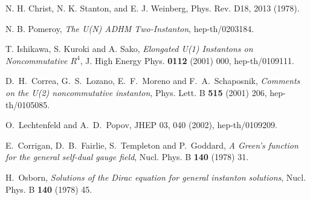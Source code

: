 \documentclass[a4paper,a4paper]{article}
\begin{document}
\begin{thebibliography}{99}
 N. H. Christ, N. K. Stanton, and E. J. Weinberg, Phys. Rev. D18,
2013 (1978).

 N. B. Pomeroy, {\it The U(N) ADHM
Two-Instanton}, hep-th/0203184.

 T. Ishikawa, S. Kuroki and A. Sako, {\it Elongated
U(1) Instantons on Noncommutative $R^4$}, J. High Energy Phys.
{\bf 0112} (2001) 000, hep-th/0109111.

 D.~H.~Correa, G.~S.~Lozano, E.~F.~Moreno and F.~A.~Schaposnik,
{\it Comments on the U(2) noncommutative instanton}, Phys. Lett. B
{\bf 515} (2001) 206, hep-th/0105085.

 O.~Lechtenfeld and A.~D.~Popov, JHEP 03, 040 (2002), hep-th/0109209.

 E.~Corrigan, D.~B.~Fairlie, S.~Templeton and
P.~Goddard, {\it A Green's function for the general self-dual
gauge field}, Nucl. Phys. B {\bf 140} (1978) 31.

 H.~Osborn, {\it Solutions of the Dirac equation for general instanton
solutions}, Nucl. Phys. B {\bf 140} (1978) 45.

\end{thebibliography}
\end{document}
